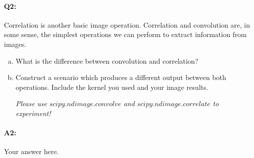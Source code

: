 

\pagebreak
\paragraph{Q2:} Correlation is another basic image operation. Correlation and convolution are, in some sense, the simplest operations we can perform to extract information from images.
\begin{enumerate}[(a)]
    \item 
    What is the difference between convolution and correlation?

    \item
    Construct a scenario which produces a different output between both operations. Include the kernel you used and your image results.
    
    \emph{Please use \href{https://docs.scipy.org/doc/scipy/reference/generated/scipy.ndimage.convolve.html}{$scipy.ndimage.convolve$} and \href{https://docs.scipy.org/doc/scipy/reference/generated/scipy.ndimage.correlate.html}{$scipy.ndimage.correlate$} to experiment!}
    
\end{enumerate}


\paragraph{A2:} Your answer here.







